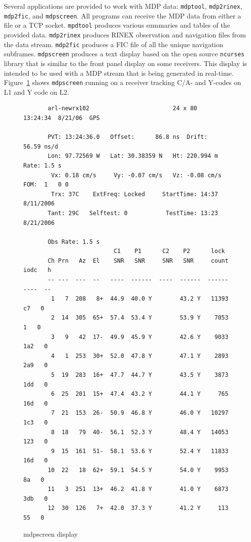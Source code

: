 \documentclass{ion-gps}
\newcommand{\gpstkapplication}[1]{\texttt{#1}}
\begin{document}
Several applications are provided to work with MDP data:
\gpstkapplication{mdptool},
\gpstkapplication{mdp2rinex}, \gpstkapplication{mdp2fic}, and
\gpstkapplication{mdpscreen}. All programs can receive the MDP data
from either a file or a TCP socket. \gpstkapplication{mpdtool}
produces various summaries and tables of the provided
data. \gpstkapplication{mdp2rinex} produces RINEX observation and
navigation files from the data stream. \gpstkapplication{mdp2fic}
produces a FIC file of all the unique navigation
subframes. \gpstkapplication{mdpscreen} produces a
text display based on the open source \gpstkapplication{ncurses}\cite{ncurses}
library that is similar to the front panel display on some
receivers. This display is intended to be used with a MDP stream
that is being generated in real-time. Figure~\ref{fig:mdpscreendump} 
shows \gpstkapplication{mdpscreen} running on a receiver tracking C/A-
and Y-codes on L1 and Y code on L2.

\begin{figure}[htbp]
\begin{small}
\begin{bf}
\begin{lstlisting}
       arl-newrx102                        24 x 80               13:24:34  8/21/06  GPS

       PVT: 13:24:36.0   Offset:      86.8 ns  Drift:     56.59 ns/d
       Lon: 97.72569 W   Lat: 30.38359 N   Ht: 220.994 m    Rate: 1.5 s
        Vx: 0.18 cm/s     Vy: -0.07 cm/s   Vz: -0.08 cm/s   FOM:  1   0 0 
        Trx: 37C    ExtFreq: Locked     StartTime: 14:37 8/11/2006
       Tant: 29C   Selftest: 0           TestTime: 13:23 8/21/2006

       Obs Rate: 1.5 s
                          C1    P1      C2    P2      lock
       Ch Prn   Az  El    SNR   SNR     SNR   SNR     count  iodc   h
       -- ---  ---  --   ----  ------  ----  ------  ------  ----  --
        1   7  208   8+  44.9  40.0 Y        43.2 Y   11393    c7   0
        2  14  305  65+  57.4  53.4 Y        53.9 Y    7053     1   0
        3   9   42  17-  49.9  45.9 Y        42.6 Y    9033   1a2   0
        4   1  253  30+  52.0  47.8 Y        47.1 Y    2893   2a9   0
        5  19  283  16+  47.7  44.7 Y        43.5 Y    3873   1dd   0
        6  25  201  15+  47.4  43.2 Y        44.1 Y     765   16d   0
        7  21  153  26-  50.9  46.8 Y        46.0 Y   10297   1c3   0
        8  18   79  40-  56.1  52.3 Y        48.4 Y   14053   123   0
        9  15  161  51-  58.1  53.6 Y        52.4 Y   11833   16d   0
       10  22   18  62+  59.1  54.5 Y        54.0 Y    9953    8a   0
       11   3  251  13+  46.2  41.8 Y        41.0 Y    6873   3db   0
       12  30  126   7+  42.0  37.3 Y        41.2 Y     113    55   0
\end{lstlisting}
\end{bf}
\end{small}
\caption{mdpscreen display}
\label{fig:mdpscreendump}
\end{figure}
\end{document}
